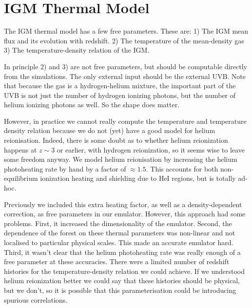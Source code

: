 \documentclass[10pt, aps, prd]{revtex4-1}
\begin{document}
\maketitle

%
\section{IGM Thermal Model}

The IGM thermal model has a few free parameters. These are: 1) The IGM mean flux and its evolution with redshift.
2) The temperature of the mean-density gas 3) The temperature-density relation of the IGM.

In principle 2) and 3) are not free parameters, but should be computable directly from the simulations.
The only external input should be the external UVB. Note that because the gas is a hydrogen-helium mixture, 
the important part of the UVB is not just the number of hydrogen ionizing photons, but the number of helium 
ionizing photons as well. So the shape does matter.

However, in practice we cannot really compute the temperature and temperature density relation 
because we do not (yet) have a good model for helium reionisation. Indeed, there is some doubt as to whether 
helium reionization happens at $z \sim 3$ or earlier, with hydrogen reionization, so it seems wise to leave some freedom anyway.
We model helium reionisation by increasing the helium photoheating rate by hand by a factor of $\approx 1.5$. 
This accounts for both non-equilibrium ionization heating and shielding due to HeI regions, but is totally ad-hoc.

Previously we included this extra heating factor, as well as a density-dependent correction, as free parameters in 
our emulator. However, this approach had some problems. First, it increased the dimensionality of the emulator. 
Second, the dependence of the forest on these thermal parameters was non-linear and not localised to particular physical scales. 
This made an accurate emulator hard. Third, it wasn't clear that the helium photoheating rate was really enough of a 
free parameter at these accuracies. There were a limited number of redshift histories for the temperature-density relation
we could achieve. If we understood helium reionization better we could say that these histories should be physical, but we 
don't, so it is possible that this parameterisation could be introducing spurious correlations.
\end{document}

